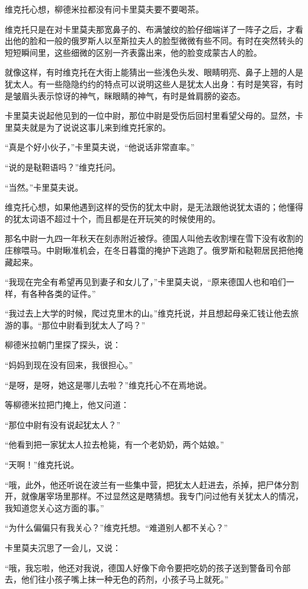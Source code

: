 维克托心想，柳德米拉都没有问卡里莫夫要不要喝茶。

维克托只是在对卡里莫夫那宽鼻子的、布满皱纹的脸仔细端详了一阵子之后，才看出他的脸和一般的俄罗斯人以至斯拉夫人的脸型微微有些不同。有时在突然转头的短短瞬间里，这些细微的区别一齐表露出来，他的脸变成蒙古人的脸。

就像这样，有时维克托在大街上能猜出一些浅色头发、眼睛明亮、鼻子上翘的人是犹太人。有一些隐隐约约的特点可以说明这些人是犹太人出身：有时是笑容，有时是皱眉头表示惊讶的神气，眯眼睛的神气，有时是耸肩膀的姿态。

卡里莫夫说起他见到的一位中尉，那位中尉是受伤后回村里看望父母的。显然，卡里莫夫就是为了说说这事儿来到维克托家的。

“真是个好小伙子，”卡里莫夫说，“他说话非常直率。”

“说的是鞑靼语吗？”维克托问。

“当然。”卡里莫夫说。

维克托心想，如果他遇到这样的受伤的犹太中尉，是无法跟他说犹太语的；他懂得的犹太词语不超过十个，而且都是在开玩笑的时候使用的。

那名中尉一九四一年秋天在刻赤附近被俘。德国人叫他去收割埋在雪下没有收割的庄稼喂马。中尉瞅准机会，在冬日暮霭的掩护下逃跑了。俄罗斯和鞑靼居民把他掩藏起来。

“我现在完全有希望再见到妻子和女儿了，”卡里莫夫说，“原来德国人也和咱们一样，有各种各类的证件。”

“我过去上大学的时候，爬过克里木的山。”维克托说，并且想起母亲汇钱让他去旅游的事。“那位中尉看到犹太人了吗？”

柳德米拉朝门里探了探头，说：

“妈妈到现在没有回来，我很担心。”

“是呀，是呀，她这是哪儿去啦？”维克托心不在焉地说。

等柳德米拉把门掩上，他又问道：

“那位中尉有没有说起犹太人？”

“他看到把一家犹太人拉去枪毙，有一个老奶奶，两个姑娘。”

“天啊！”维克托说。

“哦，此外，他还听说在波兰有一些集中营，把犹太人赶进去，杀掉，把尸体分割开，就像屠宰场里那样。不过显然这是瞎猜想。我专门问过他有关犹太人的情况，我知道您关心这方面的事。”

“为什么偏偏只有我关心？”维克托想。“难道别人都不关心？”

卡里莫夫沉思了一会儿，又说：

“哦，我忘啦，他还对我说，德国人好像下命令要把吃奶的孩子送到警备司令部去，他们往小孩子嘴上抹一种无色的药剂，小孩子马上就死。”

